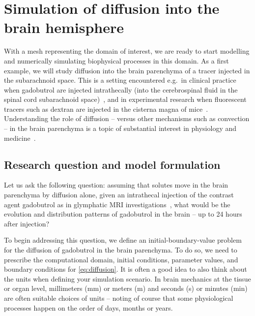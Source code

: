 \section{Simulation of diffusion into the brain hemisphere}
\label{sec:chp3:math}

With a mesh representing the domain of interest, we are ready to start
modelling and numerically simulating biophysical processes in this
domain. As a first example, we will study diffusion into the brain
parenchyma of a tracer injected in the subarachnoid space. This is a
setting encountered e.g.~in clinical practice when gadobutrol are
injected intrathecally (into the cerebrospinal fluid in the spinal
cord subarachnoid space)~\cite{ringstad2018brain}, and in experimental
research when fluorescent tracers such as dextran are injected in the
cisterna magna of mice~\cite{iliff2012paravascular,
  xie2013sleep}. Understanding the role of diffusion -- versus other
mechanisms such as convection -- in the brain parenchyma is a topic of
substantial interest in physiology and medicine~\cite{abbott2018role}.


\subsection{Research question and model formulation}
\label{chp3:model}

Let us ask the following question: assuming that solutes move in the
brain parenchyma by diffusion alone, given an intrathecal injection of
the contrast agent gadobutrol as in glymphatic MRI
investigations~\cite{ringstad2018brain}, what would be the evolution
and distribution patterns of gadobutrol in the brain -- up to 24 hours
after injection?

To begin addressing this question, we define an initial-boundary-value
problem for the diffusion of gadobutrol in the brain parenchyma. To do
so, we need to prescribe the computational domain, initial conditions,
parameter values, and boundary conditions for \eqref{eq:diffusion}. It
is often a good idea to also think about the units when defining your
simulation scenario. In brain mechanics at the tissue or organ level,
millimeters (mm) or meters (m) and seconds (s) or minutes (min) are
often suitable choices of units -- noting of course that some
physiological processes happen on the order of days, months or years.

